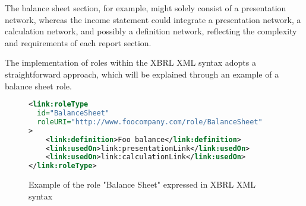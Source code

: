 The balance sheet section, for example, might solely consist of a presentation network, whereas the income statement could integrate a presentation network, 
a calculation network, and possibly a definition network, reflecting the complexity and requirements of each report section.

The implementation of roles within the XBRL XML syntax\cite{xbrl21_custom_roles} adopts a straightforward approach, 
which will be explained through an example of a balance sheet role.

\begin{figure}[H]
    \begin{lstlisting}[language=XML,basicstyle=\small\ttfamily]
<link:roleType 
  id="BalanceSheet" 
  roleURI="http://www.foocompany.com/role/BalanceSheet"
>
    <link:definition>Foo balance</link:definition>
    <link:usedOn>link:presentationLink</link:usedOn>
    <link:usedOn>link:calculationLink</link:usedOn>
</link:roleType>
\end{lstlisting}
\caption{Example of the role "Balance Sheet" expressed in XBRL XML syntax}
\label{fig:example_role_xbrl}
\end{figure}





